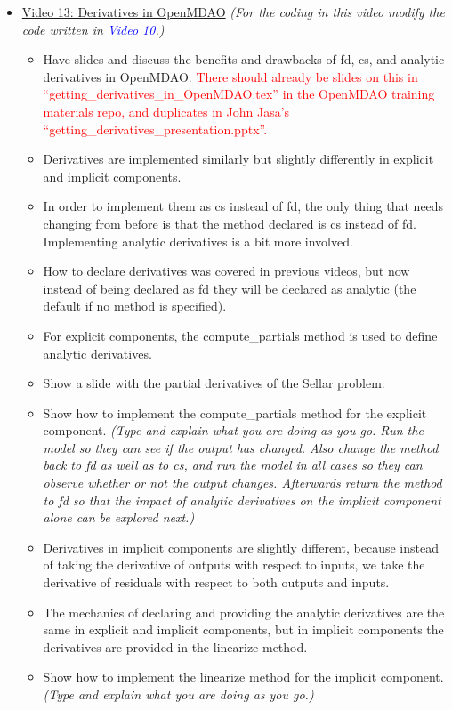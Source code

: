 \documentclass[12pt, letterpaper]{article}
\begin{document}
\begin{itemize}
	\item \underline{Video 13: Derivatives in OpenMDAO} \textit{(For the coding in this video modify the code written in \textcolor{blue}{Video 10}.)}
		\begin{itemize}
			\item Have slides and discuss the benefits and drawbacks of fd, cs, and analytic derivatives in OpenMDAO. \textcolor{red}{There should already be slides on this in “getting\_derivatives\_in\_OpenMDAO.tex” in the OpenMDAO training materials repo, and duplicates in John Jasa’s “getting\_derivatives\_presentation.pptx”.}
			\item Derivatives are implemented similarly but slightly differently in explicit and implicit components. 
			\item In order to implement them as cs instead of fd, the only thing that needs changing from before is that the method declared is cs instead of fd. Implementing analytic derivatives is a bit more involved.
			\item How to declare derivatives was covered in previous videos, but now instead of being declared as fd they will be declared as analytic (the default if no method is specified).
			\item For explicit components, the compute\_partials method is used to define analytic derivatives. 
			\item Show a slide with the partial derivatives of the Sellar problem.
			\item Show how to implement the compute\_partials method for the explicit component. \textit{(Type and explain what you are doing as you go. Run the model so they can see if the output has changed. Also change the method back to fd as well as to cs, and run the model in all cases so they can observe whether or not the output changes. Afterwards return the method to fd so that the impact of analytic derivatives on the implicit component alone can be explored next.)}
			\item Derivatives in implicit components are slightly different, because instead of taking the derivative of outputs with respect to inputs, we take the derivative of residuals with respect to both outputs and inputs.
			\item The mechanics of declaring and providing the analytic derivatives are the same in explicit and implicit components, but in implicit components the derivatives are provided in the linearize method.
			\item Show how to implement the linearize method for the implicit component. \textit{(Type and explain what you are doing as you go.)}

\end{itemize}
\end{itemize}
\end{document}
